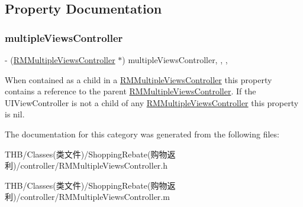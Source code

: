 \subsection{Property Documentation}
\mbox{\label{category_u_i_view_controller_07_r_m_multiple_views_controller_08_a08f849850bb40e298d286890c8fb03bc}} 
\subsubsection{\texorpdfstring{multiple\+Views\+Controller}{multipleViewsController}}
{\footnotesize\ttfamily -\/ (\mbox{\hyperlink{interface_r_m_multiple_views_controller}{R\+M\+Multiple\+Views\+Controller}} $\ast$) multiple\+Views\+Controller\hspace{0.3cm}{\ttfamily [read]}, {\ttfamily [write]}, {\ttfamily [nonatomic]}, {\ttfamily [weak]}}

When contained as a child in a {\ttfamily \mbox{\hyperlink{interface_r_m_multiple_views_controller}{R\+M\+Multiple\+Views\+Controller}}} this property contains a reference to the parent {\ttfamily \mbox{\hyperlink{interface_r_m_multiple_views_controller}{R\+M\+Multiple\+Views\+Controller}}}. If the {\ttfamily U\+I\+View\+Controller} is not a child of any {\ttfamily \mbox{\hyperlink{interface_r_m_multiple_views_controller}{R\+M\+Multiple\+Views\+Controller}}} this property is nil. 

The documentation for this category was generated from the following files\+:\begin{DoxyCompactItemize}
\item 
T\+H\+B/\+Classes(类文件)/\+Shopping\+Rebate(购物返利)/controller/R\+M\+Multiple\+Views\+Controller.\+h\item 
T\+H\+B/\+Classes(类文件)/\+Shopping\+Rebate(购物返利)/controller/R\+M\+Multiple\+Views\+Controller.\+m\end{DoxyCompactItemize}
